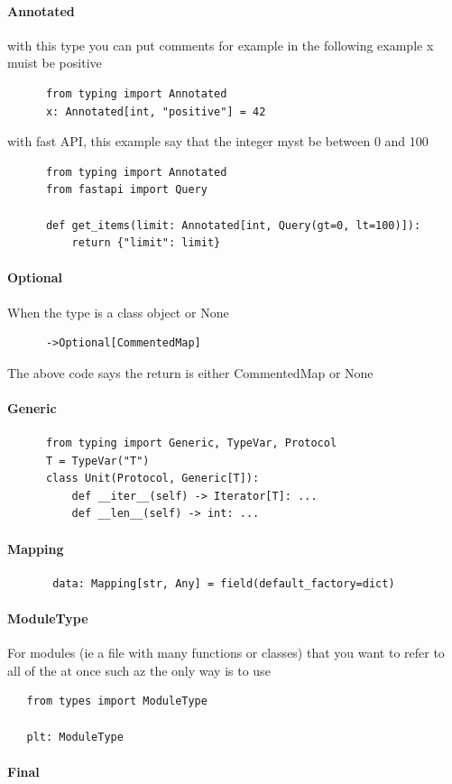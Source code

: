 \paragraph{Annotated}
   with this type you can put comments for example in the following example x muist be positive
\begin{verbatim}
      from typing import Annotated
      x: Annotated[int, "positive"] = 42
   \end{verbatim}
   with fast API, this example say that the integer myst be between 0 and 100
\begin{verbatim}
      from typing import Annotated
      from fastapi import Query
      
      def get_items(limit: Annotated[int, Query(gt=0, lt=100)]):
          return {"limit": limit}
   \end{verbatim}

\paragraph{Optional}
   
   When the type is a class object or None

\begin{verbatim}
      ->Optional[CommentedMap]
   \end{verbatim}
   
   The above code says the return is either CommentedMap or None

\paragraph{Generic}
\begin{verbatim}
      from typing import Generic, TypeVar, Protocol
      T = TypeVar("T")
      class Unit(Protocol, Generic[T]):
          def __iter__(self) -> Iterator[T]: ...
          def __len__(self) -> int: ...
   \end{verbatim}



\paragraph{Mapping}
\begin{verbatim}
       data: Mapping[str, Any] = field(default_factory=dict)
   \end{verbatim}


\paragraph{ModuleType}
   For modules (ie a file with many functions or classes)  that you want to refer to all of the at once such az  the only way is to use
   \begin{verbatim}
   from types import ModuleType

   plt: ModuleType
   \end{verbatim}

\paragraph{Final}